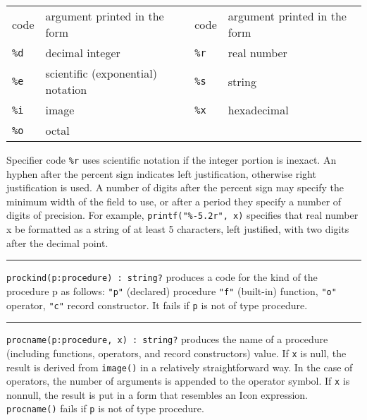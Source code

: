 \begin{xtabular}{m{0.5in} m{2.55in}m{0.5in}m{2.55in}}
code & argument printed in the form &
code & argument printed in the form \\
 \texttt{\%d}  & decimal integer        & \texttt{\%r}    & real number \\
 \texttt{\%e}  & scientific (exponential) notation & \texttt{\%s}    & string \\
 \texttt{\%i}  & image &          \texttt{\%x}    & hexadecimal \\
 \texttt{\%o}  & octal &           & \\
\end{xtabular}

Specifier code \texttt{\%r} uses scientific notation if the integer
portion is inexact.
An hyphen after the percent sign indicates left justification,
otherwise right justification is used. A number of digits after the
percent sign may specify the minimum width of the field to use, or after
a period they specify a number of digits of precision. For example,
\texttt{printf("\%-5.2r", x)} specifies that real number x be
formatted as a string of at least 5 characters, left justified,
with two digits after the decimal point.

\pagebreak


\vspace{0.25cm}\hrule{}

\texttt{prockind(p:procedure) : string?} produces a code for the kind of
the procedure p as follows: \texttt{"p"}
(declared) procedure \texttt{"f"}
(built-in) function, \texttt{"o"} operator,
\texttt{"c"} record
constructor. It fails if \texttt{p} is not of type
procedure. 

\vspace{0.25cm}\hrule{}

\texttt{procname(p:procedure, x) : string?} produces the name of a
procedure (including functions, operators, and record
constructors) value. If \texttt{x} is null,
the result is derived from \texttt{image()} in a relatively
straightforward way. In the case of operators, the number of arguments
is appended to the operator symbol. If \texttt{x} is nonnull, the
result is put in a form that resembles an Icon expression.
\texttt{procname()} fails if \texttt{p} is not of type procedure. 

